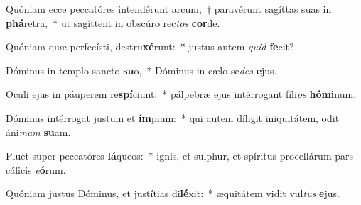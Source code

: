 \item Quóniam ecce peccatóres intendérunt arcum,~† paravérunt sagíttas suas in \textbf{phá}retra,~* ut sagíttent in obscúro rec\textit{tos} \textbf{cor}de.
\item Quóniam quæ perfecísti, destru\textbf{xé}runt:~* justus autem \textit{quid} \textbf{fe}cit?
\item Dóminus in templo sancto \textbf{su}o,~* Dóminus in cælo se\textit{des} \textbf{e}jus.
\item Oculi ejus in páuperem re\textbf{spí}ciunt:~* pálpebræ ejus intérrogant fíli\textit{os} \textbf{hó}\textbf{mi}num.
\item Dóminus intérrogat justum et \textbf{ím}pium:~* qui autem díligit iniquitátem, odit áni\textit{mam} \textbf{su}am.
\item Pluet super peccatóres \textbf{lá}queos:~* ignis, et sulphur, et spíritus procellárum pars cálicis \textit{e}\textbf{ó}rum.
\item Quóniam justus Dóminus, et justítias di\textbf{lé}xit:~* æquitátem vidit vul\textit{tus} \textbf{e}jus.
